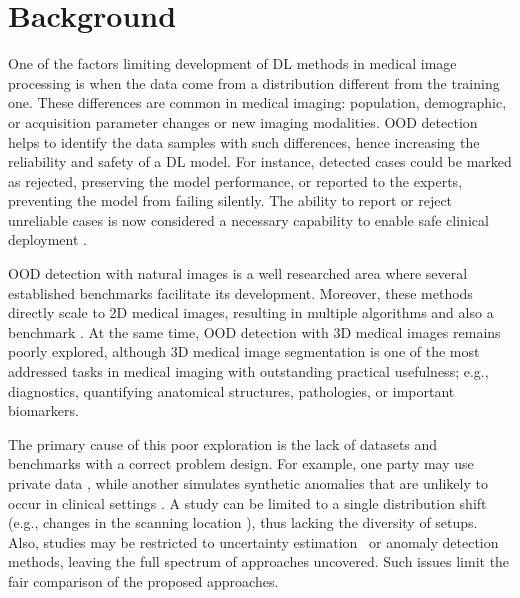 \section{Background}


One of the factors limiting development of DL methods in medical image processing is when the data come from a distribution different from the training one. These differences are common in medical imaging: population, demographic, or acquisition parameter changes or new imaging modalities. OOD detection helps to identify the data samples with such differences, hence increasing the reliability and safety of a DL model. For instance, detected cases could be marked as rejected, preserving the model performance, or reported to the experts, preventing the model from failing silently. The ability to report or reject unreliable cases is now considered a necessary capability to enable safe clinical deployment \cite{kompa2021second}.

OOD detection with natural images is a well researched area \cite{yang2024generalized} where several established benchmarks \cite{hendrycks2016baseline,basart2022scaling} facilitate its development. Moreover, these methods directly scale to 2D medical images, resulting in multiple algorithms \cite{mahmood2020multiscale,pacheco2020out,berger2021confidence} and also a benchmark \cite{cao2020benchmark}. At the same time, OOD detection with 3D medical images remains poorly explored, although 3D medical image segmentation is one of the most addressed tasks in medical imaging \cite{litjens2017survey} with outstanding practical usefulness; e.g., diagnostics, quantifying anatomical structures, pathologies, or important biomarkers.

The primary cause of this poor exploration is the lack of datasets and benchmarks with a correct problem design. For example, one party may use private data \cite{karimi2022improving}, while another simulates synthetic anomalies that are unlikely to occur in clinical settings \cite{david_zimmerer_2022_6362313}. A study can be limited to a single distribution shift (e.g., changes in the scanning location \cite{karimi2022improving}), thus lacking the diversity of setups. Also, studies may be restricted to uncertainty estimation~\cite{lambert2022improving} or anomaly detection \cite{david_zimmerer_2022_6362313} methods, leaving the full spectrum of approaches uncovered. Such issues limit the fair comparison of the proposed approaches.

